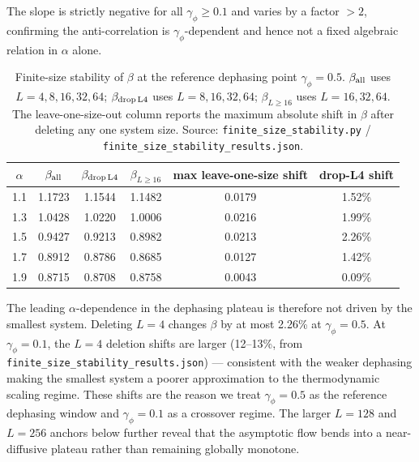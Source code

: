 \documentclass[aps,prb,twocolumn,superscriptaddress]{revtex4-2}
\begin{document}
The slope is strictly negative for all $\gamma_\phi \geq 0.1$ and varies by a factor ${>}2$, confirming the anti-correlation is $\gamma_\phi$-dependent and hence not a fixed algebraic relation in $\alpha$ alone.

\begin{table}[h]
\caption{Finite-size stability of $\beta$ at the reference dephasing point $\gamma_\phi = 0.5$. $\beta_{\rm all}$ uses $L = 4, 8, 16, 32, 64$; $\beta_{\rm drop\,L4}$ uses $L = 8, 16, 32, 64$; $\beta_{L\geq 16}$ uses $L = 16, 32, 64$. The leave-one-size-out column reports the maximum absolute shift in $\beta$ after deleting any one system size. Source: \texttt{finite\_size\_stability.py} / \texttt{finite\_size\_stability\_results.json}.}
\label{tab:S6}
\begin{ruledtabular}
\begin{tabular}{cccccc}
$\alpha$ & $\beta_{\rm all}$ & $\beta_{\rm drop\,L4}$ & $\beta_{L\geq 16}$ & max leave-one-size shift & drop-L4 shift \\
\hline
1.1 & 1.1723 & 1.1544 & 1.1482 & 0.0179 & 1.52\% \\
1.3 & 1.0428 & 1.0220 & 1.0006 & 0.0216 & 1.99\% \\
1.5 & 0.9427 & 0.9213 & 0.8982 & 0.0213 & 2.26\% \\
1.7 & 0.8912 & 0.8786 & 0.8685 & 0.0127 & 1.42\% \\
1.9 & 0.8715 & 0.8708 & 0.8758 & 0.0043 & 0.09\% \\
\end{tabular}
\end{ruledtabular}
\end{table}

The leading $\alpha$-dependence in the dephasing plateau is therefore not driven by the smallest system. Deleting $L = 4$ changes $\beta$ by at most 2.26\% at $\gamma_\phi = 0.5$. At $\gamma_\phi = 0.1$, the $L=4$ deletion shifts are larger (12--13\%, from \texttt{finite\_size\_stability\_results.json}) --- consistent with the weaker dephasing making the smallest system a poorer approximation to the thermodynamic scaling regime. These shifts are the reason we treat $\gamma_\phi = 0.5$ as the reference dephasing window and $\gamma_\phi = 0.1$ as a crossover regime. The larger $L=128$ and $L=256$ anchors below further reveal that the asymptotic flow bends into a near-diffusive plateau rather than remaining globally monotone.
\end{document}
